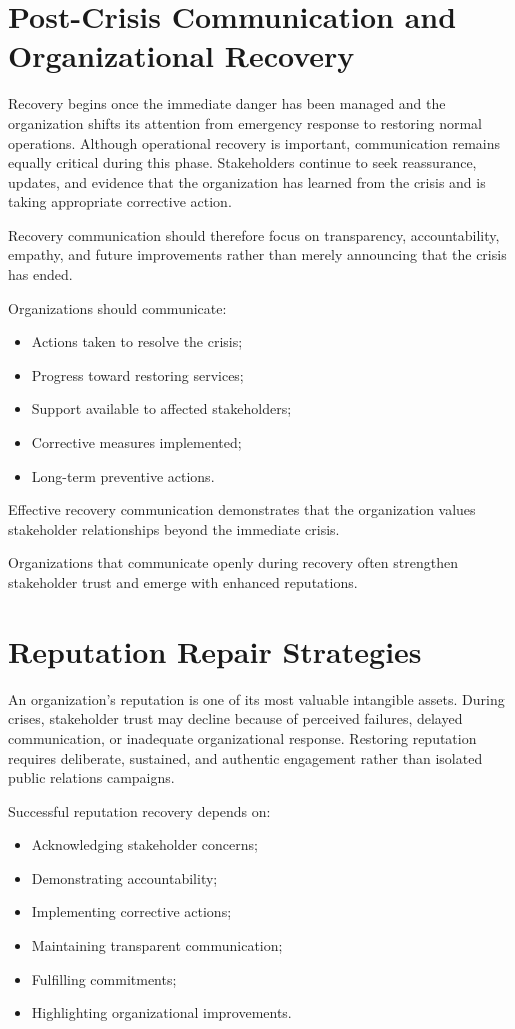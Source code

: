 \documentclass[10pt]{article}
\begin{document}
\section*{Post-Crisis Communication and Organizational Recovery}

Recovery begins once the immediate danger has been managed and the organization shifts its attention from emergency response to restoring normal operations. Although operational recovery is important, communication remains equally critical during this phase. Stakeholders continue to seek reassurance, updates, and evidence that the organization has learned from the crisis and is taking appropriate corrective action.

Recovery communication should therefore focus on transparency, accountability, empathy, and future improvements rather than merely announcing that the crisis has ended.

Organizations should communicate:
\begin{itemize}
    \item Actions taken to resolve the crisis;
    \item Progress toward restoring services;
    \item Support available to affected stakeholders;
    \item Corrective measures implemented;
    \item Long-term preventive actions.
\end{itemize}

Effective recovery communication demonstrates that the organization values stakeholder relationships beyond the immediate crisis.

Organizations that communicate openly during recovery often strengthen stakeholder trust and emerge with enhanced reputations.

\section*{Reputation Repair Strategies}

An organization's reputation is one of its most valuable intangible assets. During crises, stakeholder trust may decline because of perceived failures, delayed communication, or inadequate organizational response. Restoring reputation requires deliberate, sustained, and authentic engagement rather than isolated public relations campaigns.

Successful reputation recovery depends on:
\begin{itemize}
    \item Acknowledging stakeholder concerns;
    \item Demonstrating accountability;
    \item Implementing corrective actions;
    \item Maintaining transparent communication;
    \item Fulfilling commitments;
    \item Highlighting organizational improvements.
\end{itemize}
\end{document}
